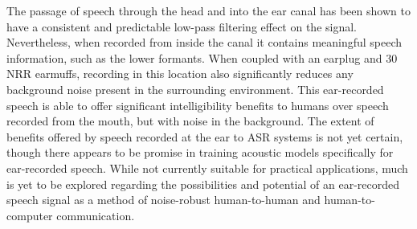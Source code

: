 The passage of speech through the head and into the ear canal has been shown to have a consistent and predictable low-pass filtering effect on the signal.  Nevertheless, when recorded from inside the canal it contains meaningful speech information, such as the lower formants.  When coupled with an earplug and 30 NRR earmuffs, recording in this location also significantly reduces any background noise present in the surrounding environment.  This ear-recorded speech is able to offer significant intelligibility benefits to humans over speech recorded from the mouth, but with noise in the background.  The extent of benefits offered by speech recorded at the ear to ASR systems is not yet certain, though there appears to be promise in training acoustic models specifically for ear-recorded speech. While not currently suitable for practical applications, much is yet to be explored regarding the possibilities and potential of an ear-recorded speech signal as a method of noise-robust human-to-human and human-to-computer communication.





